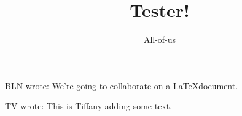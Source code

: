 \documentclass[12pt]{article}
\title{Tester!}
\author{All-of-us}
\newcommand{\bln}[1]{BLN wrote: \textcolor{red!70!blue!70}{#1}}
\newcommand{\tv}[1]{TV wrote: \textcolor{blue!70}{#1}}
\begin{document}
\maketitle

\bln{We're going to collaborate on a \LaTeX document.}

\tv{This is Tiffany adding some text.}
\end{document}
